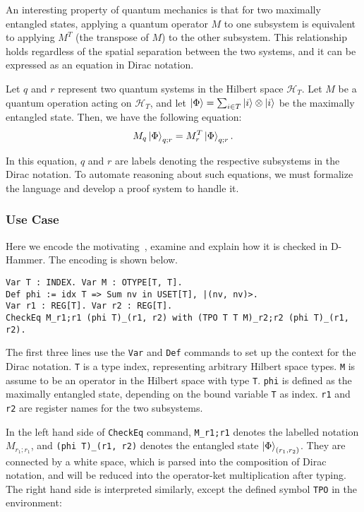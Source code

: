 An interesting property of quantum mechanics is that for two maximally entangled states, applying a quantum operator \( M \) to one subsystem is equivalent to applying \( M^T \) (the transpose of \( M \)) to the other subsystem. This relationship holds regardless of the spatial separation between the two systems, and it can be expressed as an equation in Dirac notation.
\begin{example}
    \label{ex: motivating}
    Let \( q \) and \( r \) represent two quantum systems in the Hilbert space \( \mathcal{H}_T \). Let \( M \) be a quantum operation acting on \( \mathcal{H}_T \), and let \( \ket{\Phi} = \sum_{i \in T} \ket{i} \otimes \ket{i} \) be the maximally entangled state. Then, we have the following equation:
    \[
    M_q \ket{\Phi}_{q; r} = M_r^T \ket{\Phi}_{q; r}.
    \]
\end{example}

In this equation, \( q \) and \( r \) are labels denoting the respective subsystems in the Dirac notation. To automate reasoning about such equations, we must formalize the language and develop a proof system to handle it.



\subsubsection{Use Case}
Here we encode the motivating~, examine and explain how it is checked in D-Hammer. The encoding is shown below.

    \begin{lstlisting}[style=dhammer]
Var T : INDEX. Var M : OTYPE[T, T].
Def phi := idx T => Sum nv in USET[T], |(nv, nv)>.
Var r1 : REG[T]. Var r2 : REG[T].
CheckEq M_r1;r1 (phi T)_(r1, r2) with (TPO T T M)_r2;r2 (phi T)_(r1, r2).
    \end{lstlisting}        

The first three lines use the \texttt{\textcolor{NavyBlue}{Var}} and \texttt{\textcolor{NavyBlue}{Def}} commands to set up the context for the Dirac notation.
\texttt{T} is a type index, representing arbitrary Hilbert space types. \texttt{M} is assume to be an operator in the Hilbert space with type \texttt{T}. \texttt{phi} is defined as the maximally entangled state, depending on the bound variable \texttt{T} as index.
\texttt{r1} and \texttt{r2} are register names for the two subsystems.

In the left hand side of \texttt{\textcolor{NavyBlue}{CheckEq}} command, \texttt{M\_r1;r1} denotes the labelled notation $M_{r_1; r_1}$, and \texttt{(phi T)\_(r1, r2)} denotes the entangled state $\ket{\Phi}_{(r_1, r_2)}$. They are connected by a white space, which is parsed into the composition of Dirac notation, and will be reduced into the operator-ket multiplication after typing. The right hand side is interpreted similarly, except the defined symbol \texttt{TPO} in the environment:

